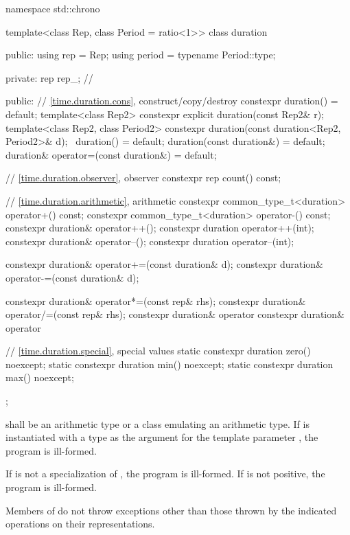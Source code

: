 %
\begin{codeblock}
namespace std::chrono {
  template<class Rep, class Period = ratio<1>>
  class duration {
  public:
    using rep    = Rep;
    using period = typename Period::type;

  private:
    rep rep_;       // \expos

  public:
    // \ref{time.duration.cons}, construct/copy/destroy
    constexpr duration() = default;
    template<class Rep2>
      constexpr explicit duration(const Rep2& r);
    template<class Rep2, class Period2>
      constexpr duration(const duration<Rep2, Period2>& d);
    ~duration() = default;
    duration(const duration&) = default;
    duration& operator=(const duration&) = default;

    // \ref{time.duration.observer}, observer
    constexpr rep count() const;

    // \ref{time.duration.arithmetic}, arithmetic
    constexpr common_type_t<duration> operator+() const;
    constexpr common_type_t<duration> operator-() const;
    constexpr duration& operator++();
    constexpr duration  operator++(int);
    constexpr duration& operator--();
    constexpr duration  operator--(int);

    constexpr duration& operator+=(const duration& d);
    constexpr duration& operator-=(const duration& d);

    constexpr duration& operator*=(const rep& rhs);
    constexpr duration& operator/=(const rep& rhs);
    constexpr duration& operator%
    constexpr duration& operator%

    // \ref{time.duration.special}, special values
    static constexpr duration zero() noexcept;
    static constexpr duration min() noexcept;
    static constexpr duration max() noexcept;
  };
}
\end{codeblock}

\pnum
{} shall be an arithmetic type or a class emulating an arithmetic type.
If  is instantiated with a  type as the argument for the template
parameter , the program is ill-formed.

\pnum
If  is not a specialization of , the program is ill-formed.
If  is not positive, the program is ill-formed.

\pnum
Members of  do not throw exceptions other than
those thrown by the indicated operations on their representations.

